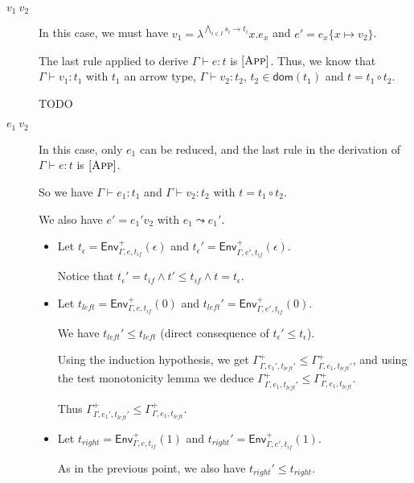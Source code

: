 \documentclass[a4paper]{article}%
\newcommand{\apply}[2]{#1\circ#2}
\newcommand{\dom}[1]{\textsf{dom}(#1)}
\newcommand{\subst}[2]{\{#1 \mapsto #2\}}
\newcommand{\Gp}[2]{\textsf{Env}^{#1}_{#2}}
\theoremstyle{definition}
\newcommand {\Rule}[1] {[\textsc{#1}]}
\begin{document}
        \begin{description}
          \item[$v_1\ v_2$] In this case, we must have $v_1=\lambda^{\bigwedge_{i\in I} s_i \rightarrow t_i}x.e_x$ and $e'=e_x\subst x {v_2}$.
    
          The last rule applied to derive $\Gamma \vdash e:t$ is $\Rule{App}$.
          Thus, we know that $\Gamma \vdash v_1 : t_1$ with $t_1$ an arrow type, $\Gamma \vdash v_2 : t_2$, $t_2 \in \dom {t_1}$ and $t=\apply {t_1} {t_2}$.
          
          TODO
    
          \item[$e_1\ v_2$] In this case, only $e_1$ can be reduced, and the last rule in the derivation of $\Gamma \vdash e:t$ is $\Rule{App}$.
          
          So we have $\Gamma \vdash e_1:t_1$ and $\Gamma \vdash v_2:t_2$ with $t=\apply {t_1} {t_2}$.
    
          We also have $e' = e_1' v_2$ with $e_1 \leadsto e_1'$.
    
          \begin{itemize}
            \item Let $t_\epsilon = \Gp + {\Gamma,e,t_{if}} (\epsilon)$ and $t_\epsilon' = \Gp + {\Gamma,e',t_{if}} (\epsilon)$.
            
            Notice that $t_\epsilon' = t_{if} \land t' \leq t_{if} \land t = t_\epsilon$.
    
            \item Let $t_{left} = \Gp + {\Gamma,e,t_{if}} (0)$ and $t_{left}' = \Gp + {\Gamma,e',t_{if}} (0)$.
    
            We have $t_{left}' \leq t_{left}$ (direct consequence of $t_\epsilon' \leq t_\epsilon$).
      
            Using the induction hypothesis, we get $\Gamma^+_{\Gamma,e_1',t_{left}'} \leq \Gamma^+_{\Gamma,e_1,t_{left}'}$,
            and using the test monotonicity lemma we deduce $\Gamma^+_{\Gamma,e_1,t_{left}'} \leq \Gamma^+_{\Gamma,e_1,t_{left}}$.
    
            Thus $\Gamma^+_{\Gamma,e_1',t_{left}'} \leq \Gamma^+_{\Gamma,e_1,t_{left}}$.
    
            \item Let $t_{right} = \Gp + {\Gamma,e,t_{if}} (1)$ and $t_{right}' = \Gp + {\Gamma,e',t_{if}} (1)$.
            
            As in the previous point, we also have $t_{right}' \leq t_{right}$.
    

\end{itemize}
\end{description}
\end{document}
